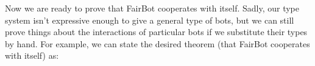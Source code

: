\begin{code}%
\>  \<%
\\
\> \AgdaSymbol{:}  \AgdaSymbol{\{}   \AgdaSymbol{\}}\<%
\\
\>[0]\<[2]%
\>[2]   \AgdaSymbol{(}  \AgdaSymbol{)}\<%
\\
\>[0]\<[2]%
\>[2]   \AgdaSymbol{(}  \AgdaSymbol{)}\<%
\\
\>[0]\<[2]%
\>[2]   \AgdaSymbol{(}  \AgdaSymbol{)}\<%
\\
\>   \AgdaSymbol{=}  \AgdaSymbol{(}   \AgdaSymbol{(}    \AgdaSymbol{))}\<%
\end{code}

Now we are ready to prove that FairBot cooperates with itself.
Sadly, our type system isn't expressive enough to give a general type of bots, but we can still prove things about the interactions of particular bots if we substitute their types by hand.
For example, we can state the desired theorem (that FairBot cooperates with itself) as:

